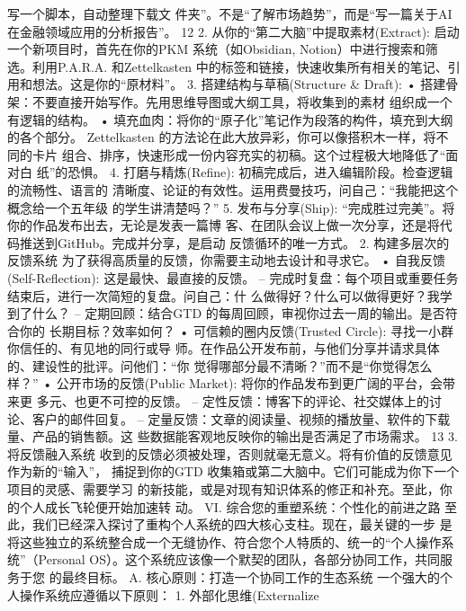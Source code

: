 \documentclass[a4paper,12pt]{article}
\begin{document}
\begin{multicols}{2}
    写一个脚本，自动整理下载文
    件夹''。不是``了解市场趋势''，而是``写一篇关于AI
    在金融领域应用的分析报告''。 12 2.
    从你的``第二大脑''中提取素材(Extract):
    启动一个新项目时，首先在你的PKM 系统（如Obsidian,
    Notion）中进行搜索和筛选。利用P.A.R.A. 和Zettelkasten
    中的标签和链接，快速收集所有相关的笔记、引用和想法。这是你的``原材料''。
    3. 搭建结构与草稿(Structure \& Draft): •
    搭建骨架：不要直接开始写作。先用思维导图或大纲工具，将收集到的素材
    组织成一个有逻辑的结构。 •
    填充血肉：将你的``原子化''笔记作为段落的构件，填充到大纲的各个部分。
    Zettelkasten 的方法论在此大放异彩，你可以像搭积木一样，将不同的卡片
    组合、排序，快速形成一份内容充实的初稿。这个过程极大地降低了``面对白
    纸''的恐惧。 4. 打磨与精炼(Refine):
    初稿完成后，进入编辑阶段。检查逻辑的流畅性、语言的
    清晰度、论证的有效性。运用费曼技巧，问自己：``我能把这个概念给一个五年级
    的学生讲清楚吗？'' 5. 发布与分享(Ship):
    ``完成胜过完美''。将你的作品发布出去，无论是发表一篇博
    客、在团队会议上做一次分享，还是将代码推送到GitHub。完成并分享，是启动
    反馈循环的唯一方式。 2. 构建多层次的反馈系统
    为了获得高质量的反馈，你需要主动地去设计和寻求它。 •
    自我反馈(Self-Reflection): 这是最快、最直接的反馈。 --
    完成时复盘：每个项目或重要任务结束后，进行一次简短的复盘。问自己：什
    么做得好？什么可以做得更好？我学到了什么？ -- 定期回顾：结合GTD
    的每周回顾，审视你过去一周的输出。是否符合你的 长期目标？效率如何？
    • 可信赖的圈内反馈(Trusted Circle):
    寻找一小群你信任的、有见地的同行或导
    师。在作品公开发布前，与他们分享并请求具体的、建设性的批评。问他们：``你
    觉得哪部分最不清晰？''而不是``你觉得怎么样？'' •
    公开市场的反馈(Public Market):
    将你的作品发布到更广阔的平台，会带来更 多元、也更不可控的反馈。 --
    定性反馈：博客下的评论、社交媒体上的讨论、客户的邮件回复。 --
    定量反馈：文章的阅读量、视频的播放量、软件的下载量、产品的销售额。这
    些数据能客观地反映你的输出是否满足了市场需求。 13 3. 将反馈融入系统
    收到的反馈必须被处理，否则就毫无意义。将有价值的反馈意见作为新的``输入''，
    捕捉到你的GTD
    收集箱或第二大脑中。它们可能成为你下一个项目的灵感、需要学习
    的新技能，或是对现有知识体系的修正和补充。至此，你的个人成长飞轮便开始加速转
    动。 VI. 综合您的重塑系统：个性化的前进之路
    至此，我们已经深入探讨了重构个人系统的四大核心支柱。现在，最关键的一步
    是将这些独立的系统整合成一个无缝协作、符合您个人特质的、统一的``个人操作系
    统''（Personal
    OS）。这个系统应该像一个默契的团队，各部分协同工作，共同服务于您
    的最终目标。 A. 核心原则：打造一个协同工作的生态系统
    一个强大的个人操作系统应遵循以下原则： 1. 外部化思维(Externalize

\end{multicols}
\end{document}
